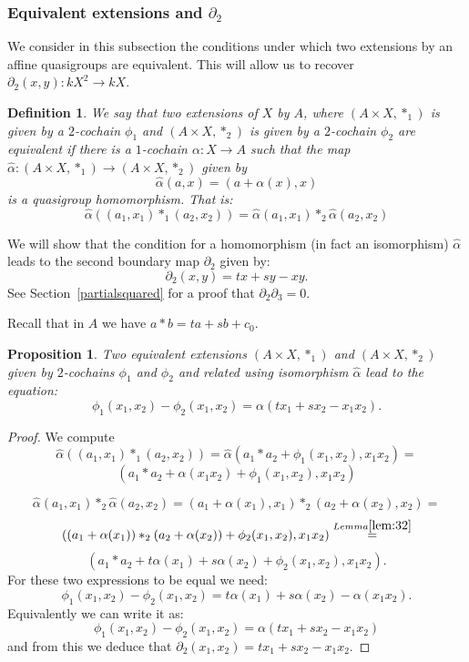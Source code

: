 \documentclass[11pt]{amsart}
\newtheorem{definition}[theorem]{Definition}
\newtheorem{proposition}[theorem]{Proposition}
\theoremstyle{definition}
\begin{document}
\subsubsection{Equivalent extensions and $\partial_2$} 

We consider in this subsection the conditions under  which two extensions by an affine quasigroups are equivalent. This will allow us to recover $\partial_2(x,y): kX^2\to kX$.
\begin{definition} 
We say that two extensions of $X$ by $A$, where $(A\times X,*_1)$ is given by a $2$-cochain $\phi_1$ and $(A\times X,*_2)$ is given by a $2$-cochain  $\phi_2$ are equivalent if there is a $1$-cochain $\alpha: X \to A$ such that the map 
$\hat\alpha: (A\times X,*_1)\to (A\times X,*_2)$ given by 
$$\hat\alpha(a,x)= (a+\alpha(x),x)$$
is a quasigroup homomorphism. That is:
$$\hat\alpha((a_1,x_1)*_1(a_2,x_2))=\hat\alpha(a_1,x_1)*_2\hat\alpha(a_2,x_2)$$
\end{definition}
We will show that the condition for a homomorphism (in fact an isomorphism) $\hat\alpha$ leads to the second boundary map $\partial_2$ given by:
$$\partial_2(x,y)= tx + sy - xy.$$
See Section~\ref{partialsquared} for a proof that $\partial_2 \partial_3 = 0$. 

Recall that in $A$ we have $a*b= ta+sb+c_0.$

\begin{proposition}\label{Second}
Two equivalent extensions $(A\times X,*_1)$ and  $(A\times X,*_2)$ given by $2$-cochains $\phi_1$ and $\phi_2$ and related using isomorphism $\hat\alpha$ lead to the equation:
$$\phi_1(x_1,x_2)- \phi_2(x_1,x_2)=\alpha(tx_1+sx_2-x_1x_2).$$

\end{proposition}
\begin{proof}
We compute
$$\hat\alpha((a_1,x_1)*_1(a_2,x_2))= \hat\alpha(a_1*a_2+\phi_1(x_1,x_2),x_1x_2)=$$
$$(a_1*a_2+ \alpha(x_1x_2)+ \phi_1(x_1,x_2),x_1x_2)$$

$$\hat\alpha(a_1,x_1)*_2\hat\alpha(a_2,x_2)=(a_1+\alpha(x_1),x_1)*_2 (a_2+\alpha(x_2),x_2)= $$
$$((a_1+\alpha(x_1))*_2(a_2+\alpha(x_2))+ \phi_2(x_1,x_2),x_1x_2)\stackrel{Lemma \ref{lem:32}}{=}$$
$$(a_1*a_2+ t\alpha(x_1)+s\alpha(x_2)+ \phi_2(x_1,x_2),x_1x_2).$$
For these two expressions to be equal we need:
$$\phi_1(x_1,x_2)-\phi_2(x_1,x_2)= t\alpha(x_1) +s\alpha(x_2)- \alpha(x_1x_2).$$
Equivalently we can write it as:
$$\phi_1(x_1,x_2)-\phi_2(x_1,x_2)= \alpha(tx_1+sx_2- x_1x_2)$$ 
and from this we deduce that
$\partial_2(x_1,x_2)= tx_1+sx_2-x_1x_2$.

\end{proof}
\end{document}

